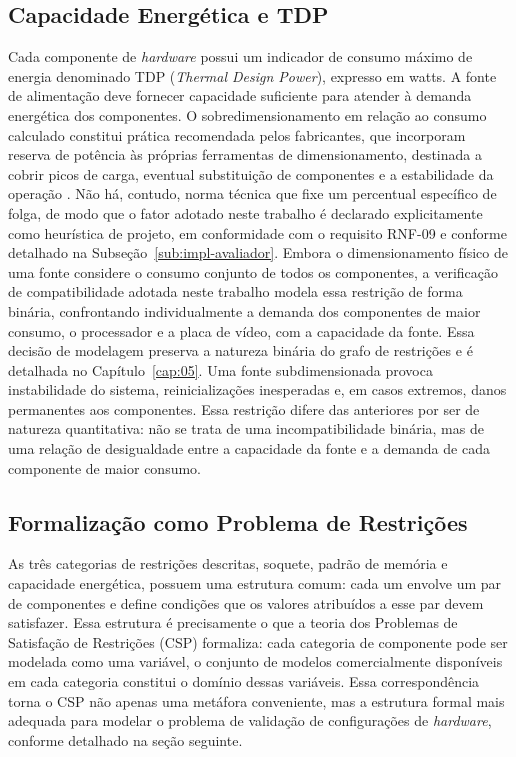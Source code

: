\subsection{Capacidade Energética e TDP}
Cada componente de \textit{hardware} possui um indicador de consumo máximo de energia denominado TDP (\textit{Thermal Design Power}),
expresso em watts. A fonte de alimentação deve fornecer capacidade suficiente para atender à demanda energética dos componentes. O
sobredimensionamento em relação ao consumo calculado constitui prática recomendada pelos fabricantes, que incorporam reserva de
potência às próprias ferramentas de dimensionamento, destinada a cobrir picos de carga, eventual substituição de componentes e a
estabilidade da operação \cite{SEASONIC2026}. Não há, contudo, norma técnica que fixe um percentual específico de folga, de modo que
o fator adotado neste trabalho é declarado explicitamente como heurística de projeto, em conformidade com o requisito RNF-09 e
conforme detalhado na Subseção~\ref{sub:impl-avaliador}. Embora o dimensionamento físico de uma fonte considere o
consumo conjunto de todos os componentes, a verificação de compatibilidade adotada neste trabalho modela essa restrição de forma binária,
confrontando individualmente a demanda dos componentes de maior consumo, o processador e a placa de vídeo, com a capacidade da fonte.
Essa decisão de modelagem preserva a natureza binária do grafo de restrições e é detalhada no Capítulo~\ref{cap:05}. Uma fonte subdimensionada
provoca instabilidade do sistema, reinicializações inesperadas e, em casos extremos, danos permanentes aos componentes. Essa restrição difere
das anteriores por ser de natureza quantitativa: não se trata de uma incompatibilidade binária, mas de uma relação de desigualdade entre a
capacidade da fonte e a demanda de cada componente de maior consumo.

\subsection{Formalização como Problema de Restrições}
As três categorias de restrições descritas, soquete, padrão de memória e capacidade energética, possuem uma estrutura comum: cada um
envolve um par de componentes e define condições que os valores atribuídos a esse par devem satisfazer. Essa estrutura é precisamente o que
a teoria dos Problemas de Satisfação de Restrições (CSP) formaliza: cada categoria de componente pode ser modelada como uma variável, o
conjunto de modelos comercialmente disponíveis em cada categoria constitui o domínio dessas variáveis. Essa correspondência torna o CSP não apenas uma metáfora conveniente, mas a
estrutura formal mais adequada para modelar o problema de validação de configurações de \textit{hardware}, conforme detalhado na seção seguinte.

